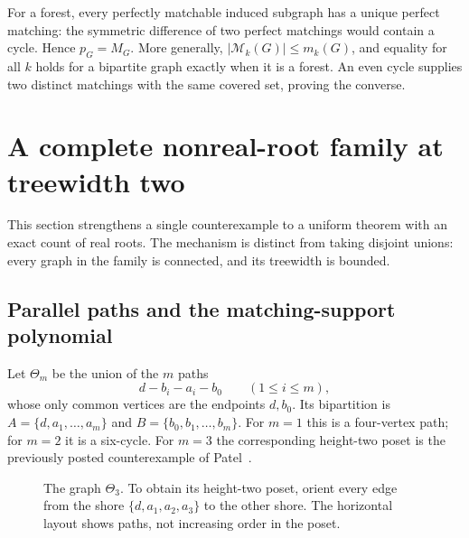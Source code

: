 \documentclass[11pt]{article}
\numberwithin{equation}{section}
\theoremstyle{definition}
\newcommand{\PM}{\mathcal M}
\begin{document}
For a forest, every perfectly matchable induced subgraph has a unique
perfect matching: the symmetric difference of two perfect matchings would
contain a cycle. Hence $p_G=M_G$. More generally,
$|\PM_k(G)|\le m_k(G)$, and equality for all $k$ holds for a bipartite graph
exactly when it is a forest. An even cycle supplies two distinct matchings
with the same covered set, proving the converse.

\section{A complete nonreal-root family at treewidth two}\label{htwo:sec:theta}

This section strengthens a single counterexample to a uniform theorem with
an exact count of real roots. The mechanism is distinct from taking disjoint
unions: every graph in the family is connected, and its treewidth is bounded.

\subsection{Parallel paths and the matching-support polynomial}

Let $\Theta_m$ be the union of the $m$ paths
\[
 d-b_i-a_i-b_0\qquad(1\le i\le m),
\]
whose only common vertices are the endpoints $d,b_0$. Its bipartition is
$A=\{d,a_1,\ldots,a_m\}$ and $B=\{b_0,b_1,\ldots,b_m\}$.
For $m=1$ this is a four-vertex path; for $m=2$ it is a six-cycle.
For $m=3$ the corresponding height-two poset is the previously posted
counterexample of Patel~\cite{Patel}.

\begin{figure}[ht]
\centering
{}
\caption{The graph $\Theta_3$. To obtain its height-two poset, orient every
edge from the shore $\{d,a_1,a_2,a_3\}$ to the other shore. The horizontal
layout shows paths, not increasing order in the poset.}
\label{htwo:fig:theta}
\end{figure}
\end{document}
